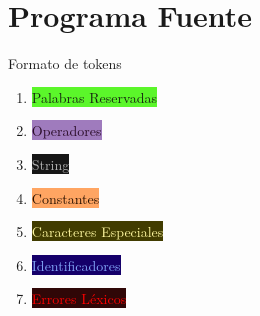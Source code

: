 \section{Programa Fuente} 

 	\frame{\sectionpage} 

\begin{frame}{Formato de tokens} 
		\begin{enumerate} 
			 \item {\textcolor[HTML]{162511}{\colorbox[HTML]{5BF62A}{ \selectfont 
				Palabras Reservadas%
			}}} 
			\item {\textcolor[HTML]{290B26}{\colorbox[HTML]{9F7BBD}{\selectfont 
				Operadores%
			}}} 
			\item {\textcolor[HTML]{B5B5B5}{\colorbox[HTML]{161616}{\selectfont 
				String%
			}}} 
			\item {\textcolor[HTML]{2A1200}{\colorbox[HTML]{FFA562}{\selectfont 
				Constantes%
			}}} 
			\item {\textcolor[HTML]{FFF8A0}{\colorbox[HTML]{413C00}{\selectfont 
				Caracteres Especiales%
			}}} 
			\item {\textcolor[HTML]{84A8FA}{\colorbox[HTML]{15006A}{\selectfont 
				Identificadores%
			}}} 
			\item {\textcolor[HTML]{FF0000}{\colorbox[HTML]{300707}{\selectfont 
				Errores Léxicos%
			}}} 
		\end{enumerate} 
	\end{frame} 

